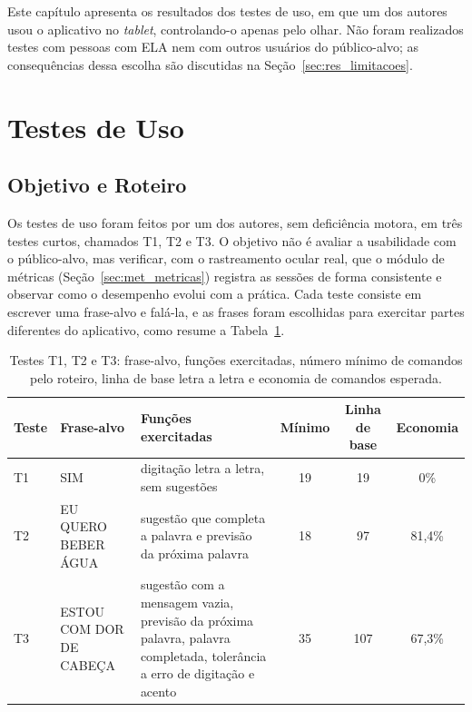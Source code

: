 Este capítulo apresenta os resultados dos testes de uso, em que um dos autores usou o aplicativo no \textit{tablet}, controlando-o apenas pelo olhar. Não foram realizados testes com pessoas com \gls{ELA} nem com outros usuários do público-alvo; as consequências dessa escolha são discutidas na Seção~\ref{sec:res_limitacoes}.

\section{Testes de Uso} \label{sec:res_testes}

    \subsection{Objetivo e Roteiro}

Os testes de uso foram feitos por um dos autores, sem deficiência motora, em três testes curtos, chamados T1, T2 e T3. O objetivo não é avaliar a usabilidade com o público-alvo, mas verificar, com o rastreamento ocular real, que o módulo de métricas (Seção~\ref{sec:met_metricas}) registra as sessões de forma consistente e observar como o desempenho evolui com a prática.
Cada teste consiste em escrever uma frase-alvo e falá-la, e as frases foram escolhidas para exercitar partes diferentes do aplicativo, como resume a Tabela~\ref{tab:testes_t1t3}.

\begin{table}[htbp]
    \centering
    \caption{Testes T1, T2 e T3: frase-alvo, funções exercitadas, número mínimo de comandos pelo roteiro, linha de base letra a letra e economia de comandos esperada.}
    \label{tab:testes_t1t3}
    \begin{tabular}{lp{3.4cm}p{4.6cm}ccc}
        \hline
        Teste & Frase-alvo & Funções exercitadas & Mínimo & Linha de base & Economia \\
        \hline
        T1 & \raggedright SIM & \raggedright digitação letra a letra, sem sugestões & 19 & 19 & 0\% \\
        T2 & \raggedright EU QUERO BEBER ÁGUA & \raggedright sugestão que completa a palavra e previsão da próxima palavra & 18 & 97 & 81,4\% \\
        T3 & \raggedright ESTOU COM DOR DE CABEÇA & \raggedright sugestão com a mensagem vazia, previsão da próxima palavra, palavra completada, tolerância a erro de digitação e acento & 35 & 107 & 67,3\% \\
        \hline
    \end{tabular}
\end{table}


